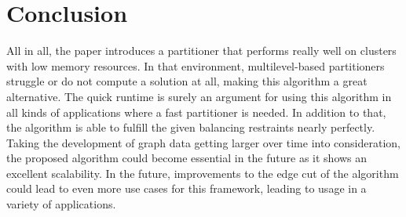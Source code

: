 \documentclass[acmsmall,nonacm,screen,review]{acmart}
\begin{document}
\section{Conclusion}
All in all, the paper introduces a partitioner that performs really well on clusters with low memory resources. In that environment, multilevel-based partitioners struggle or do not compute a solution at all, making this algorithm a great alternative. The quick runtime is surely an argument for using this algorithm in all kinds of applications where a fast partitioner is needed. In addition to that, the algorithm is able to fulfill the given balancing restraints nearly perfectly. Taking the development of graph data getting larger over time into consideration, the proposed algorithm could become essential in the future as it shows an excellent scalability.  In the future, improvements to the edge cut of the algorithm could lead to even more use cases for this framework, leading to usage in a variety of applications.


\end{document}
